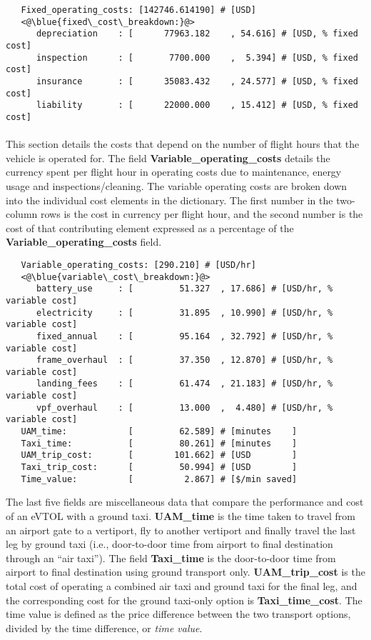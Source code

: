 \begin{lstlisting}
   Fixed_operating_costs: [142746.614190] # [USD]
   <@\blue{fixed\_cost\_breakdown:}@>
      depreciation    : [      77963.182    , 54.616] # [USD, % fixed cost]
      inspection      : [       7700.000    ,  5.394] # [USD, % fixed cost]
      insurance       : [      35083.432    , 24.577] # [USD, % fixed cost]
      liability       : [      22000.000    , 15.412] # [USD, % fixed cost]
\end{lstlisting}

\paragraph{}
This section details the costs that depend on the number of flight hours that the vehicle is operated for. The field \textbf{Variable\_operating\_costs} details the currency spent per flight hour in operating costs due to maintenance, energy usage and inspections/cleaning. The variable operating costs are broken down into the individual cost elements in the  dictionary. The first number in the two-column rows is the cost in currency per flight hour, and the second number is the cost of that contributing element expressed as a percentage of the \textbf{Variable\_operating\_costs} field.

\begin{lstlisting}
   Variable_operating_costs: [290.210] # [USD/hr]
   <@\blue{variable\_cost\_breakdown:}@>
      battery_use     : [         51.327  , 17.686] # [USD/hr, % variable cost]
      electricity     : [         31.895  , 10.990] # [USD/hr, % variable cost]
      fixed_annual    : [         95.164  , 32.792] # [USD/hr, % variable cost]
      frame_overhaul  : [         37.350  , 12.870] # [USD/hr, % variable cost]
      landing_fees    : [         61.474  , 21.183] # [USD/hr, % variable cost]
      vpf_overhaul    : [         13.000  ,  4.480] # [USD/hr, % variable cost]
   UAM_time:            [         62.589] # [minutes    ]
   Taxi_time:           [         80.261] # [minutes    ]
   UAM_trip_cost:       [        101.662] # [USD        ]
   Taxi_trip_cost:      [         50.994] # [USD        ]
   Time_value:          [          2.867] # [$/min saved]
\end{lstlisting}

The last five fields are miscellaneous data that compare the performance and cost of an eVTOL with a ground taxi. \textbf{UAM\_time} is the time taken to travel from an airport gate to a vertiport, fly to another vertiport and finally travel the last leg by ground taxi (i.e., door-to-door time from airport to final destination through an ``air taxi''). The field \textbf{Taxi\_time} is the door-to-door time from airport to final destination using ground transport only. \textbf{UAM\_trip\_cost} is the total cost of operating a combined air taxi and ground taxi for the final leg, and the corresponding cost for the ground taxi-only option is \textbf{Taxi\_time\_cost}. The time value is defined as the price difference between the two transport options, divided by the time difference, or \textit{time value}.


